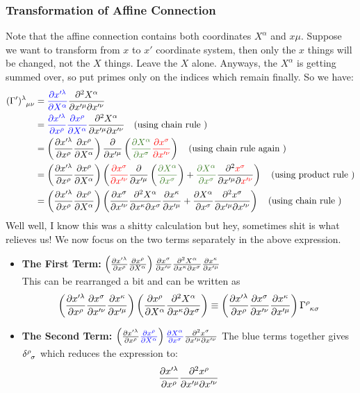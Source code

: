 \subsubsection{Transformation of Affine Connection}
Note that the affine connection contains both coordinates $X^\alpha$ and $x\mu$. Suppose we want to transform from $x$ to $x'$ coordinate system, then only the $x$ things will be changed, not the $X$ things. Leave the $X$ alone. Anyways, the $X^\alpha$ is getting summed over, so put primes only on the indices which remain finally. So we have:
\begin{align*}
    \tensor{(\Gamma')}{^\lambda _\mu _\nu} &= \mathcolor{blue}{\pdv{x'^\lambda}{X^\alpha}}\pdv{X^\alpha}{x'^\mu}{x'^\nu}\\
    &= \mathcolor{blue}{\pdv{x'^\lambda}{x^\rho}\pdv{x^\rho}{X^\alpha}}\pdv{X^\alpha}{x'^\mu}{x'^\nu} \quad \text{(using chain rule )}\\
    &=\brac{\pdv{x'^\lambda}{x^\rho}\pdv{x^\rho}{X^\alpha}} \pdv{x'^\mu}\brac{\mathcolor{OliveGreen}{\pdv{X^\alpha}{x^\sigma}}\mathcolor{red}{ \pdv{x^\sigma}{x'^\nu}}} \quad \text{(using chain rule again )}\\
    &=\brac{\pdv{x'^\lambda}{x^\rho}\pdv{x^\rho}{X^\alpha}}\brac{ { \mathcolor{red}{\pdv{x^\sigma}{x'^\nu}}\pdv{x'^\mu}\brac{\mathcolor{OliveGreen}{\pdv{X^\alpha}{x^\sigma}}} + \mathcolor{OliveGreen}{\pdv{X^\alpha}{x^\sigma}}\pdv{\mathcolor{red}{x^\sigma}}{x'^\mu}{\mathcolor{red}{x'^\nu}}}}\quad \text{(using product rule )}\\
    &=\brac{\pdv{x'^\lambda}{x^\rho}\pdv{x^\rho}{X^\alpha}} \brac{\pdv{x^\sigma}{x'^\nu} \pdv{X^\alpha}{x^\kappa}{x^\sigma}\pdv{x^\kappa}{x'^\mu}+ \pdv{X^\alpha}{x^\sigma}\pdv{x^\sigma}{x'^\mu}{x'^\nu}}\quad \text{(using chain rule )}
\end{align*}
Well well, I know this was a shitty calculation but hey, sometimes shit is what relieves us! We now focus on the two terms separately in the above expression. 
\begin{itemize}
    \item \textbf{The First Term:} $\left( \pdv{x'^\lambda}{x^\rho}\pdv{x^\rho}{X^\alpha} \right)\pdv{x^\sigma}{x'^\nu} \pdv{X^\alpha}{x^\kappa}{x^\sigma}\pdv{x^\kappa}{x'^\mu}$\\[0.3cm]
This can be rearranged a bit and can be written as 
$$   \brac{\pdv{x'^\lambda}{x^\rho}\pdv{x^\sigma}{x'^\nu} \pdv{x^\kappa}{x'^\mu}}   \brac{\pdv{x^\rho}{X^\alpha}\pdv{X^\alpha}{x^\kappa}{x^\sigma}} \equiv \brac{\pdv{x'^\lambda}{x^\rho}\pdv{x^\sigma}{x'^\nu} \pdv{x^\kappa}{x'^\mu}}  \tensor{\Gamma}{^\rho _\kappa _\sigma}$$
\item \textbf{The Second Term:} $\brac{\pdv{x'^\lambda}{x^\rho}\mathcolor{blue}{\pdv{x^\rho}{X^\alpha}}}\mathcolor{blue}{\pdv{X^\alpha}{x^\sigma}}\pdv{x^\sigma}{x'^\mu}{x'^\nu}$
The blue terms together gives $\tensor{\delta}{^\rho _\sigma}$ which reduces the expression to:
$$\pdv{x'^\lambda}{x^\rho}\pdv{x^\rho}{x'^\mu}{x'^\nu}$$
\end{itemize}
